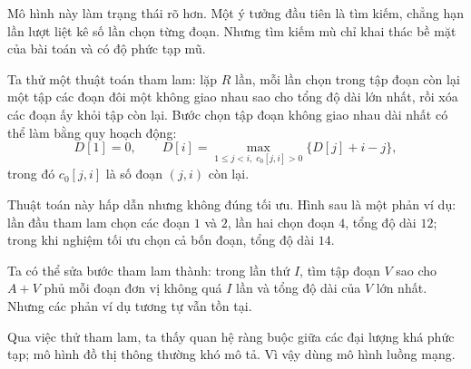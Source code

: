 \documentclass[11pt]{article}
\begin{document}
\begin{center}
\end{center}

Mô hình này làm trạng thái rõ hơn. Một ý tưởng đầu tiên là tìm kiếm, chẳng
hạn lần lượt liệt kê số lần chọn từng đoạn. Nhưng tìm kiếm mù chỉ khai thác
bề mặt của bài toán và có độ phức tạp mũ.

Ta thử một thuật toán tham lam: lặp $R$ lần, mỗi lần chọn trong tập đoạn còn
lại một tập các đoạn đôi một không giao nhau sao cho tổng độ dài lớn nhất,
rồi xóa các đoạn ấy khỏi tập còn lại. Bước chọn tập đoạn không giao nhau dài
nhất có thể làm bằng quy hoạch động:
\[
D[1]=0,\qquad
D[i]=\max_{1\le j<i,\;c_0[j,i]>0}\{D[j]+i-j\},
\]
trong đó $c_0[j,i]$ là số đoạn $(j,i)$ còn lại.

Thuật toán này hấp dẫn nhưng không đúng tối ưu. Hình sau là một phản ví dụ:
lần đầu tham lam chọn các đoạn $1$ và $2$, lần hai chọn đoạn $4$, tổng độ dài
$12$; trong khi nghiệm tối ưu chọn cả bốn đoạn, tổng độ dài $14$.

\begin{center}
\end{center}

Ta có thể sửa bước tham lam thành: trong lần thứ $I$, tìm tập đoạn $V$ sao
cho $A+V$ phủ mỗi đoạn đơn vị không quá $I$ lần và tổng độ dài của $V$ lớn
nhất. Nhưng các phản ví dụ tương tự vẫn tồn tại.

Qua việc thử tham lam, ta thấy quan hệ ràng buộc giữa các đại lượng khá phức
tạp; mô hình đồ thị thông thường khó mô tả. Vì vậy dùng mô hình luồng mạng.
\end{document}
